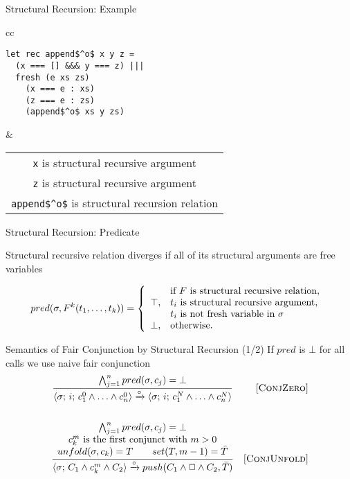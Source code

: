 \documentclass[14pt,aspectratio=169]{beamer}
\let\\\tabularnewline
\let\\\tabularnewline
\newcommand{\ruleno}[1]{\mbox{[\textsc{#1}]}}
\newcommand{\inbr}[1]{\langle #1 \rangle}
\theoremstyle{definition}
\begin{document}
\begin{frame}[fragile]{Structural Recursion: Example}
\begin{tabular}{cc}
\begin{lstlisting}
let rec append$^o$ x y z =
  (x === [] &&& y === z) |||
  fresh (e xs zs)
    (x === e : xs)
    (z === e : zs)
    (append$^o$ xs y zs)
\end{lstlisting} &
\begin{tabular}{c}
\lstinline|x| is structural recursive argument \\[5mm]
\lstinline|z| is structural recursive argument \\[5mm]
\lstinline|append$^o$| is structural recursion relation
\end{tabular}
\end{tabular}
\end{frame}

\begin{frame}[fragile]{Structural Recursion: Predicate}

\centering
Structural recursive relation diverges if all of its structural arguments are free variables

\[
pred(\sigma, F^k(t_1, \ldots, t_k)) = \left\{
\begin{array}{cl}
      & \mbox{if } F \mbox{ is structural recursive relation, } \\
\top, & t_i \mbox { is structural recursive argument, } \\
      & t_i \mbox { is not fresh variable in } \sigma \\
\bot, & \mbox{otherwise.}
\end{array}
\right.
\]
\end{frame}

\begin{frame}[fragile]{Semantics of Fair Conjunction by Structural Recursion (1/2)}
\vskip3mm
\centering
If $pred$ is $\bot$ for all calls we use naive fair conjunction
\[\begin{array}{cr}
\dfrac{\bigwedge_{j=1}^n pred(\sigma, c_j) = \bot}
      {\inbr{\sigma;\, i;\, c_1^0 \land \ldots \land c_n^0} \xrightarrow{\circ} \inbr{\sigma;\, i;\, c_1^N \land \ldots \land c_n^N}}
      &  \ruleno{ConjZero} \\[10mm]
      \dfrac{\begin{array}{c}
          \bigwedge_{j=1}^n pred(\sigma, c_j) = \bot \\
           c_k^m \mbox{ is the first conjunct with } m > 0 \\ 
           unfold(\sigma, c_k) = T \qquad set(T, m - 1) = \bar{T}
          \end{array}
      }
      {
      \inbr{\sigma;\, C_1 \land c_k^m \land C_2} \xrightarrow{\circ} push(C_1 \land \Box \land C_2, \bar{T})
      }
      &     \ruleno{ConjUnfold}
\end{array}\]
\end{frame}
\end{document}
